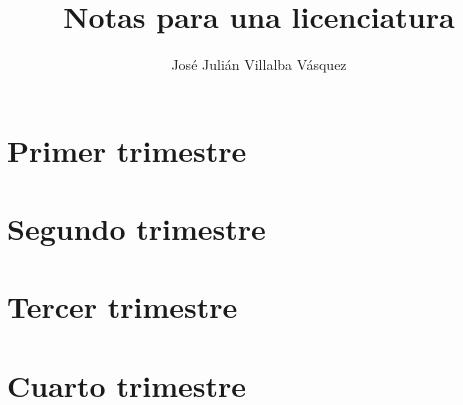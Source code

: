 \documentclass[
	12pt,
	fleqn,
	twosides,
]{book}
\title{Notas para una licenciatura}
\author{José Julián Villalba Vásquez}
\begin{document}
\layout

\maketitle



\part{Primer trimestre}







\part{Segundo trimestre}







\part{Tercer trimestre}









\part{Cuarto trimestre}







% 
\end{document}
